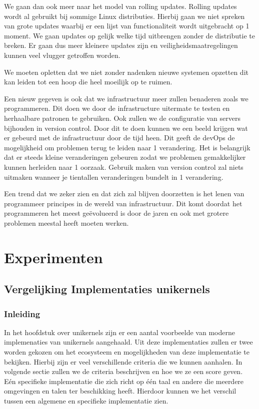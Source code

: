 \documentclass[pdftex,a4paper,12pt,twoside]{report}
\begin{document}
We gaan dan ook meer naar het model van rolling updates. Rolling updates wordt al gebruikt bij sommige Linux distributies. Hierbij gaan we niet spreken van grote updates waarbij er een lijst van functionaliteit wordt uitgebracht op 1 moment. We gaan updates op gelijk welke tijd uitbrengen zonder de distributie te breken. Er gaan dus meer kleinere updates zijn en veiligheidsmaatregelingen kunnen veel vlugger getroffen worden.

We moeten opletten dat we niet zonder nadenken nieuwe systemen opzetten dit kan leiden tot een hoop die heel moeilijk op te ruimen. 

Een nieuw gegeven is ook dat we infrastructuur meer zullen benaderen zoals we programmeren. Dit doen we door de infrastructure uitermate te testen en herhaalbare patronen te gebruiken. Ook zullen we de configuratie van servers bijhouden in version control. Door dit te doen kunnen we een beeld krijgen wat er gebeurd met de infrastructuur door de tijd heen. Dit geeft de devOps de mogelijkheid om problemen terug te leiden naar 1 verandering. Het is belangrijk dat er steeds kleine veranderingen gebeuren zodat we problemen gemakkelijker kunnen herleiden naar 1 oorzaak. Gebruik maken van version control zal niets uitmaken wanneer je tientallen veranderingen bundelt in 1 verandering. 

Een trend dat we zeker zien en dat zich zal blijven doorzetten is het lenen van programmeer principes in de wereld van infrastructuur. Dit komt doordat het programmeren het meest geëvolueerd is door de jaren en ook met grotere problemen meestal heeft moeten werken.

\chapter{Experimenten}
\label{ch:experimenten}

\section{Vergelijking Implementaties unikernels}

\subsection{Inleiding}

In het hoofdstuk over unikernels zijn er een aantal voorbeelde van  moderne implemenaties van unikernels aangehaald. Uit deze implementaties zullen er twee worden gekozen om het ecosysteem en mogelijkheden van deze implementatie te bekijken. Hierbij zijn er veel verschillende criteria die we kunnen aanhalen. In volgende sectie zullen we de criteria beschrijven en hoe we ze een score geven. Eén specifieke implementatie die zich richt op één taal en andere die meerdere omgevingen en talen ter beschikking heeft. Hierdoor kunnen we het verschil tussen een algemene en specifieke implementatie zien.
\end{document}
